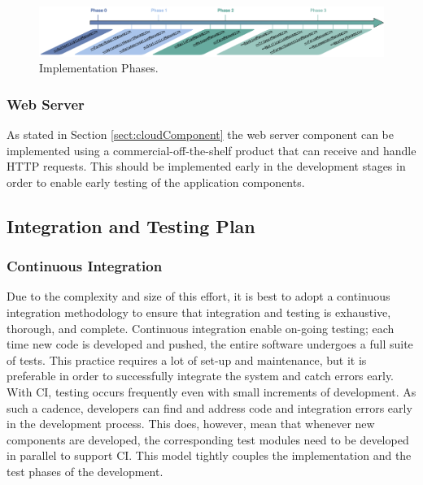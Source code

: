 \begin{figure}[hbt!]
\centering
\includegraphics[width=\textwidth]{../images_diagrams/dd/implementation_phases.png}
\caption{Implementation Phases.}
\label{fig:implementationPhases}
\end{figure}

\subsubsection{Web Server}
\begin{flushleft}
As stated in Section \ref{sect:cloudComponent} the web server component can be implemented using a commercial-off-the-shelf product that can receive and handle HTTP requests. This should be implemented early in the development stages in order to enable early testing of the application components. 
\end{flushleft}

\subsection{Integration and Testing Plan} \label{sect:ITP}
\subsubsection{Continuous Integration}
\label{sect:CI}
\begin{flushleft}
Due to the complexity and size of this effort, it is best to adopt a continuous integration methodology to ensure that integration and testing is exhaustive, thorough, and complete. Continuous integration enable on-going testing; each time new code is developed and pushed, the entire software undergoes a full suite of tests. This practice requires a lot of set-up and maintenance, but it is preferable in order to successfully integrate the system and catch errors early.\\
\smallskip
With CI, testing occurs frequently even with small increments of development. As such a cadence, developers can find and address code and integration errors early in the development process. This does, however, mean that whenever new components are developed, the corresponding test modules need to be developed in parallel to support CI. This model tightly couples the implementation and the test phases of the development.
\end{flushleft}

